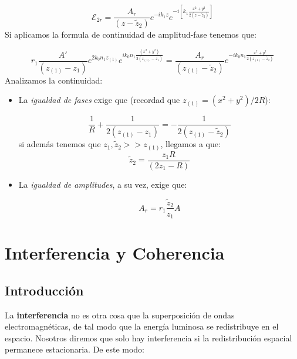 \documentclass[12pt,a4paper]{book}
\numberwithin{equation}{section}
\numberwithin{figure}{section}
\newcommand{\ccorchetes}[1]{\left[ #1  \right]}
\newcommand{\1}{_{(1)}}
\newcommand{\2}{_{(2)}}
\theoremstyle{definition}
\begin{document}
\begin{equation}
\mathcal{E}_{2r} = \frac{A_{r}}{(z-\tilde{z}_2)} e^{- i k_1 z} e^{- i \ccorchetes{k_1 \frac{x^2 + y^2}{2(z-\tilde{z}_2)}}}
\end{equation}
Si aplicamos la formula de continuidad de amplitud-fase tenemos que:

\begin{equation}
r_1 \frac{A'}{(z_{(1)}-z_1)} e^{2k_0n_1 z_{(1)}} e^{i k_0 n_1 \frac{(x^2+y^2)}{2(z_{(1)}-z_1)}} = \frac{A_r}{(z_{(1)}-\tilde{z}_2)} e^{-i k_0 n_1 \frac{x^2+y^2}{2(z_{(1)}-\tilde{z}_2)}}
\end{equation}
Analizamos la continuidad:

\begin{itemize}
\item La \textit{igualdad de fases} exige que (recordad que $z_{(1)} = (x^2+y^2)/2R$):

\begin{equation}
\dfrac{1}{R} + \frac{1}{2(z_{(1)}-z_1)} = -\frac{1}{2(z_{(1)}-\tilde{z}_2)}
\end{equation}
si además tenemos que $z_1,\tilde{z}_2 >> z_{(1)}$, llegamos a que:
\begin{equation}
\tilde{z}_2 = \frac{z_1 R}{(2z_1 - R)}
\end{equation}

\item La \textit{igualdad de amplitudes}, a su vez, exige que:

\begin{equation}
A_r = r_1 \frac{\tilde{z}_2}{z_1} A
\end{equation}


\end{itemize}

\hrulefill


\newpage

\chapter{Interferencia y Coherencia}

\section{Introducción}

La \textbf{interferencia} no es otra cosa que la superposición de ondas electromagnéticas, de tal modo que la energía luminosa se redistribuye en el espacio. Nosotros diremos que solo hay interferencia si la redistribución espacial permanece estacionaria. De este modo:
\end{document}
